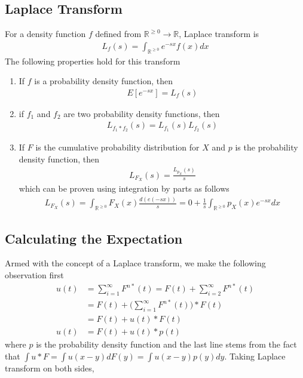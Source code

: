 \documentclass[../probability-notes.tex]{subfiles}
\begin{document}
    \subsection{Laplace Transform}
    For a density function $f$ defined from $\mathbb{R}^{\geq 0} \to \mathbb{R}$, Laplace transform is
    \begin{align*}
        L_{f}(s) = \int_{\mathbb{R}^{\geq 0}} e^{-sx} f(x) dx
    \end{align*}
    The following properties hold for this transform
    \begin{enumerate}
        \item If $f$ is a probability density function, then
        \begin{align*}
            E[e^{-sx}] = L_{f}(s)
        \end{align*}

        \item if $f_{1}$ and $f_{2}$ are two probability density functions, then
        \begin{align*}
            L_{f_{1}*f_{2}}(s) = L_{f_{1}}(s) L_{f_{2}}(s)
        \end{align*}

        \item \label{itm:laplace3} If $F$ is the cumulative probability distribution for $X$ and $p$ is the probability density function, then
        \begin{align*}
            L_{F_{X}}(s) = \frac{L_{p_{X}}(s)}{s}
        \end{align*}
        which can be proven using integration by parts as follows
        \begin{align*}
            L_{F_{X}}(s) = \int_{\mathbb{R}^{\geq 0}} F_{X}(x) \frac{d(e(-sx))}{s} = 0 + \frac{1}{s} \int_{\mathbb{R}^{\geq 0}} p_{X}(x) e^{-sx} dx
        \end{align*}
    \end{enumerate}

    \subsection{Calculating the Expectation}
    Armed with the concept of a Laplace transform, we make the following observation first
    \begin{align*}
        u(t) &= \sum_{i=1}^{\infty} F^{n*}(t) = F(t) + \sum_{i=2}^{\infty} F^{n*}(t)\\
        &= F(t) + \big( \sum_{i=1}^{\infty} F^{n*}(t) \big) * F(t)\\
        &= F(t) + u(t) * F(t)\\
       u(t) &= F(t) + u(t) * p(t)
    \end{align*}
    where $p$ is the probability density function and the last line stems from the fact that $\int u * F = \int u(x-y) dF(y) = \int u(x-y) p(y) dy$. Taking Laplace transform on both sides,
\end{document}
